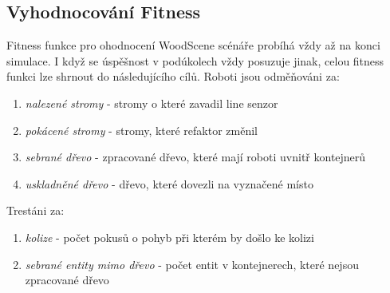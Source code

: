 \subsection*{Vyhodnocování Fitness}
Fitness funkce pro ohodnocení WoodScene scénáře probíhá vždy až na konci simulace. I když se úspěšnost v podúkolech  vždy posuzuje jinak, celou fitness funkci lze shrnout do následujícího cílů. Roboti jsou odměňováni za: 
\begin{enumerate}
        \item \textit{nalezené stromy} - stromy o které zavadil line senzor 
        \item \textit{pokácené stromy} - stromy, které refaktor změnil 
        \item \textit{sebrané dřevo} - zpracované dřevo, které mají roboti uvnitř kontejnerů 
        \item \textit{uskladněné dřevo} - dřevo, které dovezli na vyznačené místo 
\end{enumerate}
Trestáni za:
\begin{enumerate}
	\item \textit{kolize} - počet pokusů o pohyb při kterém by došlo ke kolizi 
	\item \textit{sebrané entity mimo dřevo} - počet entit v kontejnerech, které nejsou zpracované dřevo 
\end{enumerate}

